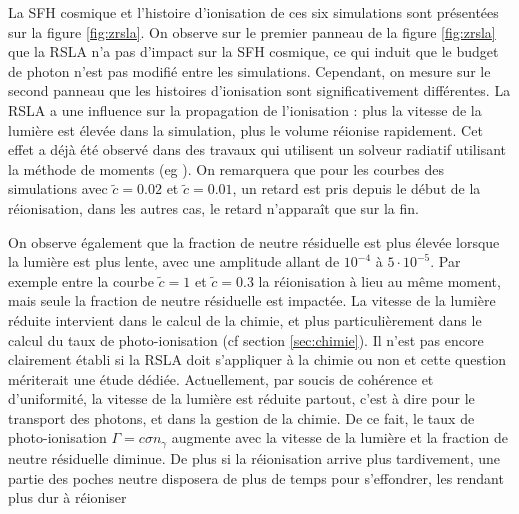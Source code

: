 La \ac{SFH} cosmique et l'histoire d'ionisation de ces six simulations sont présentées sur la figure \ref{fig:zrsla}.
On observe sur le premier panneau de la figure \ref{fig:zrsla} que la \ac{RSLA} n'a pas d'impact sur la \ac{SFH} cosmique, ce qui induit que le budget de photon n'est pas modifié entre les simulations.
Cependant, on mesure sur le second panneau que les histoires d'ionisation sont significativement différentes.%
La \ac{RSLA} a une influence sur la propagation de l'ionisation : plus la vitesse de la lumière est élevée dans la simulation, plus le volume réionise rapidement.
Cet effet a déjà été observé dans des travaux qui utilisent un solveur radiatif utilisant la méthode de moments (eg \cite{rosdahl_ramsesrt_2013}).
On remarquera que pour les courbes des simulations avec $\tilde{c}=0.02$ et $\tilde{c}=0.01$, un retard est pris depuis le début de la réionisation, dans les autres cas, le retard n’apparaît que sur la fin.

On observe également que la fraction de neutre résiduelle est plus élevée lorsque la lumière est plus lente, avec une amplitude allant de $10^{-4}$ à $5 \cdot 10 ^{-5}$.
Par exemple entre la courbe $\tilde{c}=1$ et $\tilde{c}=0.3$ la réionisation à lieu au même moment, mais seule la fraction de neutre résiduelle est impactée.
La vitesse de la lumière réduite intervient dans le calcul de la chimie, et plus particulièrement dans le calcul du taux de photo-ionisation (cf section \ref{sec:chimie}).
Il n'est pas encore clairement établi si la \ac{RSLA} doit s’appliquer à la chimie ou non et cette question mériterait une étude dédiée.
Actuellement, par soucis de cohérence et d'uniformité, la vitesse de la lumière est réduite partout, c'est à dire pour le transport des photons, et dans la gestion de la chimie.
De ce fait, le taux de photo-ionisation $\Gamma = c \sigma n_\gamma$ augmente avec la vitesse de la lumière et la fraction de neutre résiduelle diminue.
De plus si la réionisation arrive plus tardivement, une partie des poches neutre disposera de plus de temps pour s'effondrer, les rendant plus dur à réioniser

